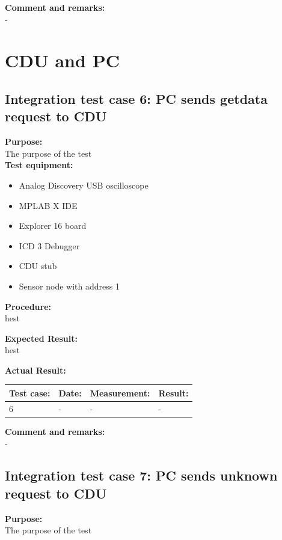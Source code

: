 \textbf{Comment and remarks:}\\
-\\


\section{CDU and PC}
\subsection{Integration test case 6: PC sends getdata request to CDU}
\textbf{Purpose:}\\
The purpose of the test\\

\textbf{Test equipment:}
\begin{itemize}
\item Analog Discovery USB oscilloscope
\item MPLAB X IDE
\item Explorer 16 board
\item ICD 3 Debugger
\item CDU stub
\item Sensor node with address 1
\end{itemize}

\textbf{Procedure:}\\
hest

\textbf{Expected Result:}\\
hest

\textbf{Actual Result:}\\
\begin{table}[H]
\centering
\begin{tabular}{|p{2cm}|p{2cm}|p{3cm}|p{2cm}|}\hline
\textbf{Test case:} & \textbf{Date:} & \textbf{Measurement:} & \textbf{Result:} \\ \hline
6 & - & - & - \\ \hline
\end{tabular}
\end{table}


\textbf{Comment and remarks:}\\
-\\

\subsection{Integration test case 7: PC sends unknown request to CDU}
\textbf{Purpose:}\\
The purpose of the test\\

